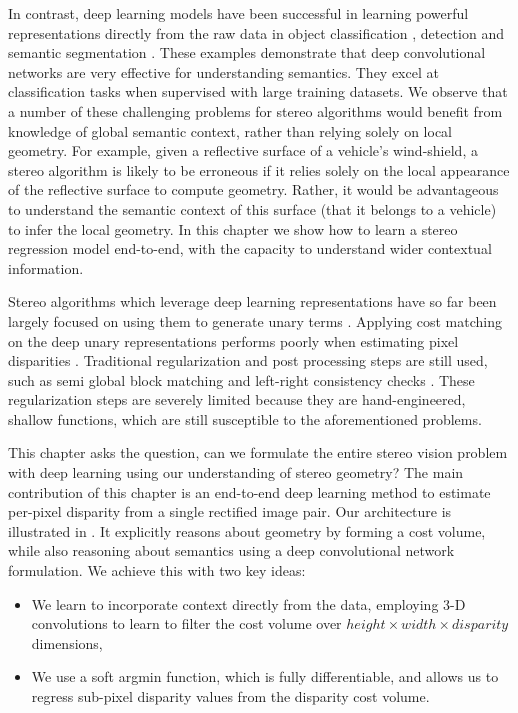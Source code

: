 In contrast, deep learning models have been successful in learning powerful representations directly from the raw data in object classification \citep{krizhevsky2012imagenet}, detection \citep{girshick2014rich} and semantic segmentation \citep{long2015fully,badrinarayanan2017segnet}. These examples demonstrate that deep convolutional networks are very effective for understanding semantics. They excel at classification tasks when supervised with large training datasets. We observe that a number of these challenging problems for stereo algorithms would benefit from knowledge of global semantic context, rather than relying solely on local geometry. For example, given a reflective surface of a vehicle's wind-shield, a stereo algorithm is likely to be erroneous if it relies solely on the local appearance of the reflective surface to compute geometry. Rather, it would be advantageous to understand the semantic context of this surface (that it belongs to a vehicle) to infer the local geometry. In this chapter we show how to learn a stereo regression model end-to-end, with the capacity to understand wider contextual information.

Stereo algorithms which leverage deep learning representations have so far been largely focused on using them to generate unary terms \citep{zbontar2015computing,luo2016efficient}. Applying cost matching on the deep unary representations performs poorly when estimating pixel disparities \citep{luo2016efficient,zbontar2015computing}. Traditional regularization and post processing steps are still used, such as semi global block matching and left-right consistency checks \citep{hirschmuller2005accurate}. These regularization steps are severely limited because they are hand-engineered, shallow functions, which are still susceptible to the aforementioned problems.

This chapter asks the question, can we formulate the entire stereo vision problem with deep learning using our understanding of stereo geometry? The main contribution of this chapter is an end-to-end deep learning method to estimate per-pixel disparity from a single rectified image pair. Our architecture is illustrated in . It explicitly reasons about geometry by forming a cost volume, while also reasoning about semantics using a deep convolutional network formulation. We achieve this with two key ideas:
\begin{itemize}
\item We learn to incorporate context directly from the data, employing 3-D convolutions to learn to filter the cost volume over $height\times width\times disparity$ dimensions,
\item We use a soft argmin function, which is fully differentiable, and allows us to regress sub-pixel disparity values from the disparity cost volume.
\end{itemize}

